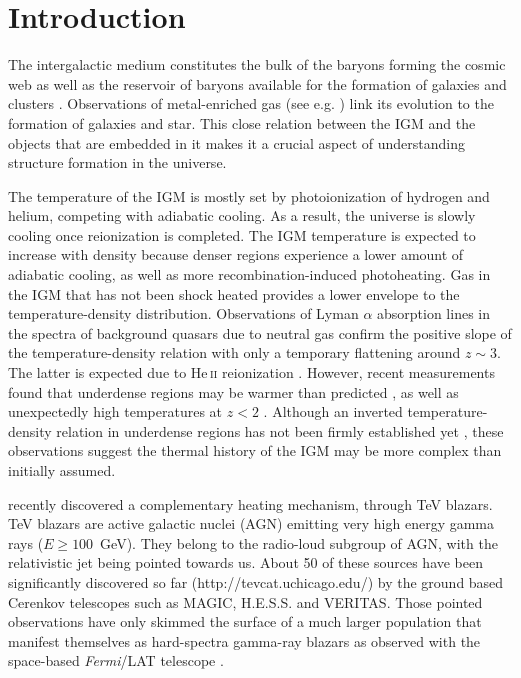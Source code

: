 \documentclass[numberedappendix]{emulateapj}
\begin{document}
\section{Introduction}
The intergalactic medium constitutes the bulk of the baryons forming the cosmic web \citep{1996Natur.380..603B} as well as the reservoir of baryons available for the formation of galaxies and clusters \citep{1997ApJ...489....7R}. Observations of metal-enriched gas (see e.g. \citet{2009A&A...493..409S,2010MNRAS.407.2063W}) link its evolution to the formation of galaxies and star. This close relation between the IGM and the objects that are embedded in it makes it a crucial aspect of understanding structure formation in the universe.

The temperature of the IGM is mostly set by photoionization of hydrogen and helium, competing with adiabatic cooling. As a result, the universe is slowly cooling once reionization is completed. The IGM temperature is expected to increase with density because denser regions experience a lower amount of adiabatic cooling, as well as more recombination-induced photoheating. Gas in the IGM that has not been shock heated provides a lower envelope to the temperature-density distribution. Observations of Lyman $\alpha$ absorption lines in the spectra of background quasars due to neutral gas confirm the positive slope of the temperature-density relation \citep{2000MNRAS.318..817S,2000ApJ...534...41R,2012ApJ...757L..30R} with only a temporary flattening around $z\sim3$. The latter is expected due to He\,\textsc{ii} reionization \citep[e.g.][]{2009ApJ...694..842M,2013MNRAS.435.3169C,2014arXiv1410.1531P}. However, recent measurements found that underdense regions may be warmer than predicted \citep{2009MNRAS.399L..39V,2008MNRAS.386.1131B}, as well as unexpectedly high temperatures at $z<2$ \citep{2014MNRAS.441.1916B}. Although an inverted temperature-density relation in underdense regions has not been firmly established yet \citep{2014MNRAS.438.2499B}, these observations suggest the thermal history of the IGM may be more complex than initially assumed.

\citet{2012ApJ...752...22B} recently discovered a complementary heating mechanism, through TeV blazars. TeV blazars are active galactic nuclei (AGN) emitting very high energy gamma rays ($E\ge100$~GeV). They belong to the radio-loud subgroup of AGN, with the relativistic jet being pointed towards us. About 50 of these sources have been significantly discovered so far (http://tevcat.uchicago.edu/) by the ground based Cerenkov telescopes such as MAGIC, H.E.S.S. and VERITAS. Those pointed observations have only skimmed the surface of a much larger population that manifest themselves as hard-spectra gamma-ray blazars as observed with the space-based \textit{Fermi}/LAT telescope \citep{2014ApJ...790..137B}. 
\end{document}
